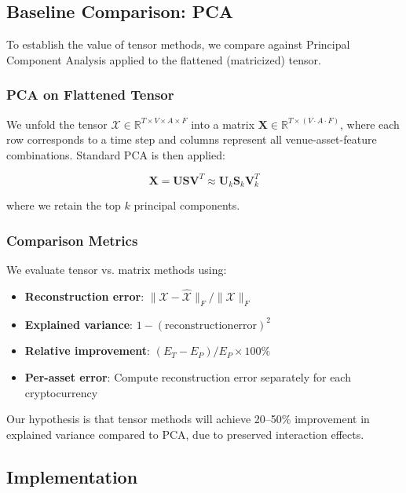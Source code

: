 \documentclass[11pt,twocolumn]{article}
\begin{document}
\subsection{Baseline Comparison: PCA}

To establish the value of tensor methods, we compare against Principal Component Analysis applied to the flattened (matricized) tensor.

\subsubsection{PCA on Flattened Tensor}

We unfold the tensor $\mathcal{X} \in \mathbb{R}^{T \times V \times A \times F}$ into a matrix $\mathbf{X} \in \mathbb{R}^{T \times (V \cdot A \cdot F)}$, where each row corresponds to a time step and columns represent all venue-asset-feature combinations. Standard PCA is then applied:

$$\mathbf{X} = \mathbf{U} \mathbf{S} \mathbf{V}^T \approx \mathbf{U}_k \mathbf{S}_k \mathbf{V}_k^T$$

where we retain the top $k$ principal components.

\subsubsection{Comparison Metrics}

We evaluate tensor vs. matrix methods using:

\begin{itemize}[leftmargin=*]
    \item \textbf{Reconstruction error}: $\|\mathcal{X} - \hat{\mathcal{X}}\|_F / \|\mathcal{X}\|_F$
    \item \textbf{Explained variance}: $1 - (\mathrm{reconstruction error})^2$
    \item \textbf{Relative improvement}: $(E_{T} - E_{P}) / E_{P} \times 100\%$
    \item \textbf{Per-asset error}: Compute reconstruction error separately for each cryptocurrency
\end{itemize}

Our hypothesis is that tensor methods will achieve 20--50\% improvement in explained variance compared to PCA, due to preserved interaction effects.

\subsection{Implementation}
\end{document}
